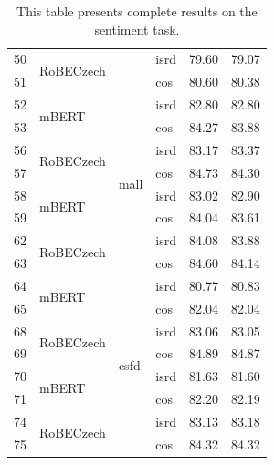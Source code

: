 \begin{table}[]
{\begin{tabular}{|l|l|l|l||ll|}
50 & \multirow{2}{*}{RoBECzech} &                           & isrd                  & 79.60   & 79.07 \\ \cline{1-1} \cline{4-6}
51 &                            &                           & cos                   & 80.60   & 80.38 \\ \hline
52 & \multirow{2}{*}{mBERT}     & \multirow{8}{*}{mall}     & isrd                  & 82.80   & 82.80 \\ \cline{1-1} \cline{4-6}
53 &                            &                           & cos                   & 84.27   & 83.88 \\ \cline{1-2} \cline{4-6}
56 & \multirow{2}{*}{RoBECzech} &                           & isrd                  & 83.17   & 83.37 \\ \cline{1-1} \cline{4-6}
57 &                            &                           & cos                   & 84.73   & 84.30 \\ \cline{1-2} \cline{4-6}
58 & \multirow{2}{*}{mBERT}     &                           & isrd                  & 83.02   & 82.90 \\ \cline{1-1} \cline{4-6}
59 &                            &                           & cos                   & 84.04   & 83.61 \\ \cline{1-2} \cline{4-6}
62 & \multirow{2}{*}{RoBECzech} &                           & isrd                  & 84.08   & 83.88 \\ \cline{1-1} \cline{4-6}
63 &                            &                           & cos                   & 84.60   & 84.14 \\ \hline
64 & \multirow{2}{*}{mBERT}     & \multirow{8}{*}{csfd}     & isrd                  & 80.77   & 80.83 \\ \cline{1-1} \cline{4-6}
65 &                            &                           & cos                   & 82.04   & 82.04 \\ \cline{1-2} \cline{4-6}
68 & \multirow{2}{*}{RoBECzech} &                           & isrd                  & 83.06   & 83.05 \\ \cline{1-1} \cline{4-6}
69 &                            &                           & cos                   & 84.89   & 84.87 \\ \cline{1-2} \cline{4-6}
70 & \multirow{2}{*}{mBERT}     &                           & isrd                  & 81.63   & 81.60 \\ \cline{1-1} \cline{4-6}
71 &                            &                           & cos                   & 82.20   & 82.19 \\ \cline{1-2} \cline{4-6}
74 & \multirow{2}{*}{RoBECzech} &                           & isrd                  & 83.13   & 83.18 \\ \cline{1-1} \cline{4-6}
75 &                            &                           & cos                   & 84.32   & 84.32 \\ \hline
\end{tabular}}
\caption{This table presents complete results on the sentiment task. }
\label{tab:res_all_sent}
\end{table}


